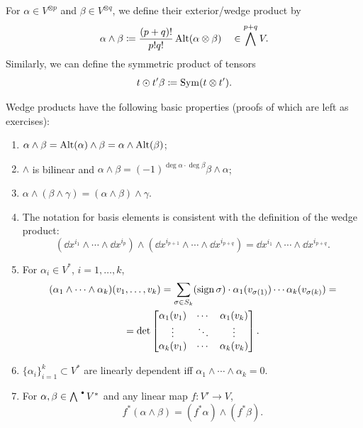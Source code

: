 \begin{defn}\label{def exterior and sym product}
    For $\alpha\in V^{\otimes p}$ and $\beta\in V^{\otimes q}$, we define their exterior/wedge product by
    \[\alpha\wedge\beta\coloneqq\frac{(p+q)!}{p!q!}\operatorname{Alt} (\alpha\otimes \beta)\quad \in \bigwedge^{p+q}V.\]
    Similarly, we can define the symmetric product of tensors 
    \[t\odot t'\beta\coloneqq\operatorname{Sym}(t\otimes t').\]
\end{defn}
Wedge products have the following basic properties (proofs of which are left as exercises):
\begin{enumerate}
    \item $\alpha\wedge\beta=\operatorname{Alt}(\alpha)\wedge\beta=\alpha\wedge\operatorname{Alt}(\beta)$;
    \item $\wedge$ is bilinear and $\alpha\wedge\beta=(-1)^{\deg\alpha\cdot\deg\beta}\beta\wedge\alpha$;
    \item $\alpha\wedge(\beta\wedge\gamma)=(\alpha\wedge\beta)\wedge\gamma$.
    \item The notation for basis elements is consistent with the definition of the wedge product:
    \[(\dd x^{i_1}\wedge\cdots\wedge \dd x^{i_p})\wedge (\dd x^{i_{p+1}}\wedge\cdots\wedge \dd x^{i_{p+q}})=\dd x^{i_1}\wedge\cdots\wedge \dd x^{i_{p+q}}.\]
    \item For $\alpha_i\in V^\ast$, $i=1,\ldots,k$, 
    \begin{multline}
        (\alpha_1\wedge\cdots\wedge\alpha_k)(v_1,\ldots,v_k)=\sum_{\sigma\in S_k}(\operatorname{sign}\sigma)\cdot \alpha_1(v_{\sigma(1)})\cdots\alpha_k(v_{\sigma(k)})=\\=\det \begin{bmatrix}
         \alpha_1(v_1) & \cdots & \alpha_1(v_k)  \\
         \vdots & \ddots & \vdots \\
         \alpha_k(v_1) & \cdots & \alpha_k(v_k) 
    \end{bmatrix}.\label{form determinant f-la}
    \end{multline}
    \item $\{\alpha_i\}_{i=1}^k\subset V^\ast$ are linearly dependent iff $\alpha_1\wedge\cdots\wedge\alpha_k=0$.
    \item For $\alpha,\beta\in\bigwedge^{\smbullet } V^\ast$ and any linear map $f:V'\to V$,
    \[f^\ast(\alpha\wedge\beta)=(f^\ast\alpha)\wedge(f^\ast\beta).\label{pullbacks of wedges}\]
\end{enumerate}

